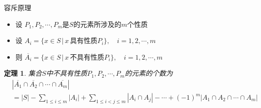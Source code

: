 \documentclass[punct]{ctexbeamer}
\newtheorem{thm}{定理}[]
\begin{document}
\begin{frame}{容斥原理}
\begin{itemize}
	\item 设 $P_{1},P_{2},\cdots,P_{m}$是$S$的元素所涉及的$m$个性质
	\item 设 $A_{i}=\{x\in S \, |\, x\, \text{具有性质}P_{i}\}, \quad i=1,2,\cdots,m$
	\item 则 $\overline{A_{i}}=\{x\in S \, | \, x\, \text{不具有性质}P_{i}\},\quad  i=1,2,\cdots,m$
\end{itemize}
\begin{thm}
	集合$S$中不具有性质$P_{1},P_{2},\cdots,P_{m}$的元素的个数为\[\begin{aligned}
	&\left|\overline{A_{1}} \cap \overline{A_{2}} \cap \cdots \cap \overline{A_{m}}\right| \\
	&=|S|-\sum_{1 \leq i \leq m}\left|A_{i}\right|+\sum_{1 \leq i<j \leq m}\left|A_{i} \cap A_{j}\right|-\cdots+(-1)^{m}\left|A_{1} \cap A_{2} \cap \cdots \cap A_{m}\right|
	\end{aligned}\]
\end{thm}
\end{frame}
%
%
%
%
\end{document}

